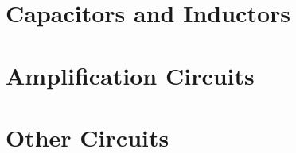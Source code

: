 \documentclass{book}
\begin{document}




\part{Capacitors and Inductors}






\part{Amplification Circuits}


\part{Other Circuits}

% 

\appendix







\end{document}
